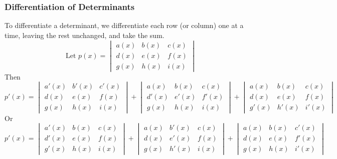 \documentclass[14]{article}
\theoremstyle{definition}
\begin{document}
\subsubsection{Differentiation of Determinants}
To differentiate a determinant, we differentiate each row (or column) one at a time, leaving the rest unchanged, and take the sum.
\[\text{Let } p(x)= 
\begin{vmatrix}a(x)&b(x)&c(x)\\d(x)&e(x)&f(x)\\g(x)&h(x)&i(x)\end{vmatrix}
\]
Then
\[p'(x) = 
\begin{vmatrix}a'(x)&b'(x)&c'(x)\\d(x)&e(x)&f(x)\\g(x)&h(x)&i(x)\end{vmatrix} +
\begin{vmatrix}a(x)&b(x)&c(x)\\d'(x)&e'(x)&f'(x)\\g(x)&h(x)&i(x)\end{vmatrix} +
\begin{vmatrix}a(x)&b(x)&c(x)\\d(x)&e(x)&f(x)\\g'(x)&h'(x)&i'(x)\end{vmatrix}
\]
Or
\[p'(x) = 
\begin{vmatrix}a'(x)&b(x)&c(x)\\d'(x)&e(x)&f(x)\\g'(x)&h(x)&i(x)\end{vmatrix} +
\begin{vmatrix}a(x)&b'(x)&c(x)\\d(x)&e'(x)&f(x)\\g(x)&h'(x)&i(x)\end{vmatrix} +
\begin{vmatrix}a(x)&b(x)&c'(x)\\d(x)&e(x)&f'(x)\\g(x)&h(x)&i'(x)\end{vmatrix}
\]
\end{document}
